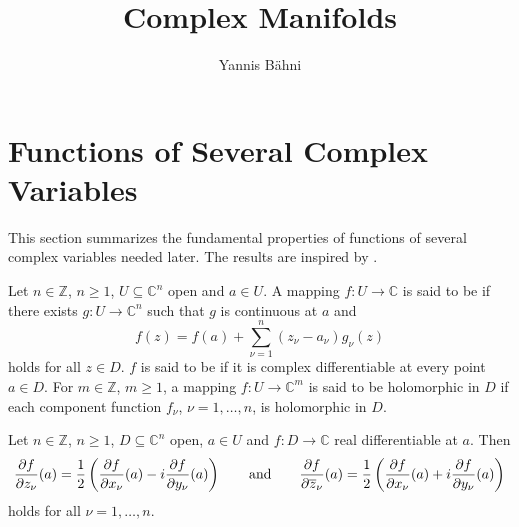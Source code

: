 
\newcommand{\Cscr}{\mathscr{C}}
\newcommand{\op}{\mathrm{op}}
\DeclareMathOperator\End{End}
\DeclareMathOperator\Hom{Hom}
\DeclareMathOperator\Mat{Mat}

\title{Complex Manifolds}
\author{Yannis B\"ahni}
\address[Yannis B\"ahni]{Universität Zürich, R\"amistrasse 71, 8006 Zurich}


\maketitle
\begin{abstract}

\end{abstract}

\tableofcontents

\section{Functions of Several Complex Variables}
This section summarizes the fundamental properties of functions of several complex variables needed later. The results are inspired by \cite[14--30]{grauert:complex_manifolds:2010}.

\begin{definition}
Let $n \in \mathbb{Z}$, $n \geq 1$, $U \subseteq \mathbb{C}^n$ open and $a \in U$. A mapping $f : U \to \mathbb{C}$ is said to be  if there exists $g : U \to \mathbb{C}^n$ such that $g$ is continuous at $a$ and
\begin{equation}
f(z) = f(a) + \sum_{\nu = 1}^n(z_\nu - a_\nu)g_\nu(z)
\end{equation} 
\noindent holds for all $z \in D$. $f$ is said to be  if it is complex differentiable at every point $a \in D$. For $m \in \mathbb{Z}$, $m \geq 1$, a mapping $f : U \to \mathbb{C}^m$ is said to be holomorphic in $D$ if each component function $f_\nu$, $\nu = 1,\dots,n$, is holomorphic in $D$.
\label{def:holomorphic}
\end{definition}

\begin{proposition}
Let $n \in \mathbb{Z}$, $n \geq 1$, $D \subseteq \mathbb{C}^n$ open, $a \in U$ and $f : D \to \mathbb{C}$ real differentiable at $a$. Then
\begin{equation}
\frac{\partial f}{\partial z_\nu}(a) = \frac{1}{2}\del[3]{\frac{\partial f}{\partial x_\nu}(a) - i \frac{\partial f}{\partial y_\nu}(a)} \qquad \text{and} \qquad \frac{\partial f}{\partial \overline{z}_\nu}(a) = \frac{1}{2}\del[3]{\frac{\partial f}{\partial x_\nu}(a) + i \frac{\partial f}{\partial y_\nu}(a)}
\end{equation}  
\noindent holds for all $\nu = 1,\dots,n$.
\label{prop:Wirtinger}
\end{proposition}


